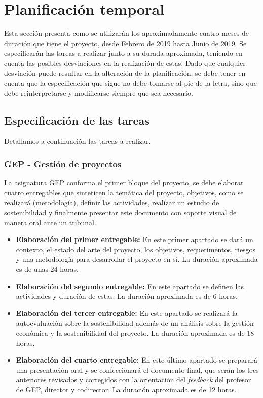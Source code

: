 \section{Planificación temporal}

Esta sección presenta como se utilizarán los aproximadamente cuatro meses de duración que tiene el proyecto, desde Febrero de 2019 hasta Junio de 2019. Se especificarán las tareas a realizar junto a su durada aproximada, teniendo en cuenta las posibles desviaciones en la realización de estas. Dado que cualquier desviación puede resultar en la alteración de la planificación, se debe tener en cuenta que la especificación que sigue no debe tomarse al pie de la letra, sino que debe reinterpretarse y modificarse siempre que sea necesario. 

\subsection{Especificación de las tareas}

Detallamos a continuación las tareas a realizar.

\subsubsection{GEP - Gestión de proyectos}

La asignatura GEP conforma el primer bloque del proyecto, se debe elaborar cuatro entregables que sinteticen la temática del proyecto, objetivos, como se realizará (metodología), definir las actividades, realizar un estudio de sostenibilidad y finalmente presentar este documento con soporte visual de manera oral ante un tribunal.

\begin{itemize}
 \item \textbf{Elaboración del primer entregable:} En este primer apartado se dará un contexto, el estado del arte del proyecto, los objetivos, requerimentos, riesgos y una metodología para desarrollar el proyecto en sí. La duración aproximada es de unas 24 horas.
 \item \textbf{Elaboración del segundo entregable:} En este apartado se definen las actividades y duración de estas. La duración aproximada es de 6 horas.
 \item \textbf{Elaboración del tercer entregable:} En este apartado se realizará la autoevaluación sobre la sostenibilidad además de un análisis sobre la gestión económica y la sostenibilidad del proyecto. La duración aproximada es de 18 horas.
 \item \textbf{Elaboración del cuarto entregable:} En este último apartado se preparará una presentación oral y se confeccionará el documento final, que serán los tres anteriores revisados y corregidos con la orientación del \textit{feedback} del profesor de GEP, director y codirector. La duración aproximada es de 12 horas.
\end{itemize}

